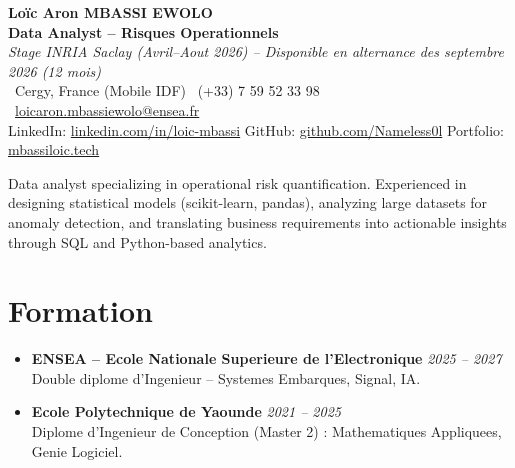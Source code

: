 \documentclass[a4paper,11pt]{article}
\begin{document}
\begin{center}
    {\Large \textbf{Lo\"ic Aron MBASSI EWOLO}} \\ \vspace{4pt}
    \textbf{\large Data Analyst -- Risques Operationnels} \\
    \textit{\small Stage INRIA Saclay (Avril--Aout 2026) -- Disponible en alternance des septembre 2026 (12 mois)} \\ \vspace{4pt}
    \small
    \Pointinghand\ Cergy, France (Mobile IDF) \quad
    \Mobilefone\ (+33) 7 59 52 33 98 \quad
    {\color{primary}\Letter\ \href{mailto:loicaron.mbassiewolo@ensea.fr}{loicaron.mbassiewolo@ensea.fr}} \\ \vspace{2pt}
    {\color{primary}LinkedIn: \href{https://www.linkedin.com/in/loic-mbassi/}{linkedin.com/in/loic-mbassi}} \quad
    {\color{primary}GitHub: \href{https://github.com/Nameless0l}{github.com/Nameless0l}} \quad
    {\color{primary}Portfolio: \href{https://mbassiloic.tech}{mbassiloic.tech}}
\end{center}

\vspace{-6pt}

\noindent\small{Data analyst specializing in operational risk quantification. Experienced in designing statistical models (scikit-learn, pandas), analyzing large datasets for anomaly detection, and translating business requirements into actionable insights through SQL and Python-based analytics.}

\section{Formation}
\begin{itemize}[leftmargin=*, label=\tiny$\bullet$, nosep]
    \item \textbf{ENSEA -- Ecole Nationale Superieure de l'Electronique} \hfill \textit{2025 -- 2027} \\
    \small{Double diplome d'Ingenieur -- Systemes Embarques, Signal, IA.}
    \item \textbf{Ecole Polytechnique de Yaounde} \hfill \textit{2021 -- 2025} \\
    \small{Diplome d'Ingenieur de Conception (Master 2) : Mathematiques Appliquees, Genie Logiciel.}
\end{itemize}
\end{document}
